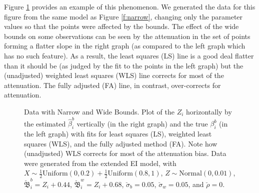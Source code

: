 \documentclass[11pt,titlepage]{article}
\newcommand{\bbeta}{{\mathfrak B}}
\newcommand{\sigmau}{\breve{\sigma}}
\newcommand{\rhou}{\breve{\rho}}
\begin{document}
Figure \ref{f:mixed} provides an example of this phenomenon.  We
generated the data for this figure from the same model as Figure
\ref{f:narrow}, changing only the parameter values so that the points
were affected by the bounds.  The effect of the wide bounds on some
observations can be seen by the attenuation in the set of points
forming a flatter slope in the right graph (as compared to the left
graph which has no such feature).  As a result, the least squares (LS)
line is a good deal flatter than it should be (as judged by the fit to
the points in the left graph) but the (unadjusted) weighted least
squares (WLS) line corrects for most of the attenuation.  The fully
adjusted (FA) line, in contrast, over-corrects for attenuation.
\begin{figure}[t]
  \begin{center}
    \caption{Data with Narrow and Wide Bounds. Plot of the $Z_i$ 
      horizontally by the estimated $\hat\beta_i^b$ vertically (in the
      right graph) and the true $\beta_i^b$ (in the left graph) with
      fits for least squares (LS), weighted least squares (WLS), and
      the fully adjusted method (FA).  Note how (unadjusted) WLS
      corrects for most of the attenuation bias.  Data were generated
      from the extended EI model, with $X \sim
      \frac{1}{2}\textrm{Uniform}(0,0.2) +
      \frac{1}{2}\textrm{Uniform}(0.8,1)$, $Z \sim
      \textrm{Normal}(0,0.01)$, $\breve\bbeta_i^b = Z_i + 0.44$,
      $\breve\bbeta_i^w = Z_i + 0.68$, $\sigmau_b = 0.05$, $\sigmau_w
      = 0.05$, and $\rhou = 0$.}
    \label{f:mixed}
  \end{center}
\end{figure}
\end{document}
